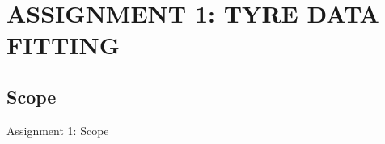 \section{ASSIGNMENT 1: TYRE DATA FITTING}
\subsection{Scope}
\begin{frame}{Assignment 1: Scope}
  
\end{frame}
